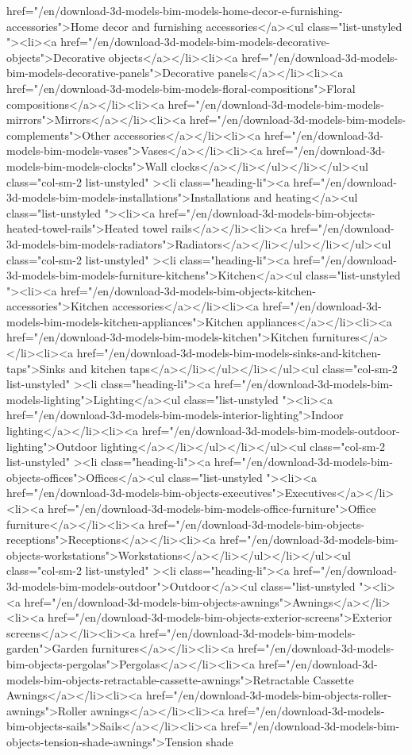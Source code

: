 href="/en/download-3d-models-bim-models-home-decor-e-furnishing-accessories">Home decor and furnishing accessories</a><ul class="list-unstyled "><li><a href="/en/download-3d-models-bim-models-decorative-objects">Decorative objects</a></li><li><a href="/en/download-3d-models-bim-models-decorative-panels">Decorative panels</a></li><li><a href="/en/download-3d-models-bim-models-floral-compositions">Floral compositions</a></li><li><a href="/en/download-3d-models-bim-models-mirrors">Mirrors</a></li><li><a href="/en/download-3d-models-bim-models-complements">Other accessories</a></li><li><a href="/en/download-3d-models-bim-models-vases">Vases</a></li><li><a href="/en/download-3d-models-bim-models-clocks">Wall clocks</a></li></ul></li></ul><ul class="col-sm-2 list-unstyled" ><li class="heading-li"><a href="/en/download-3d-models-bim-models-installations">Installations and heating</a><ul class="list-unstyled "><li><a href="/en/download-3d-models-bim-objects-heated-towel-rails">Heated towel rails</a></li><li><a href="/en/download-3d-models-bim-models-radiators">Radiators</a></li></ul></li></ul><ul class="col-sm-2 list-unstyled" ><li class="heading-li"><a href="/en/download-3d-models-bim-models-furniture-kitchens">Kitchen</a><ul class="list-unstyled "><li><a href="/en/download-3d-models-bim-objects-kitchen-accessories">Kitchen accessories</a></li><li><a href="/en/download-3d-models-bim-models-kitchen-appliances">Kitchen appliances</a></li><li><a href="/en/download-3d-models-bim-models-kitchen">Kitchen furnitures</a></li><li><a href="/en/download-3d-models-bim-models-sinks-and-kitchen-taps">Sinks and kitchen taps</a></li></ul></li></ul><ul class="col-sm-2 list-unstyled" ><li class="heading-li"><a href="/en/download-3d-models-bim-models-lighting">Lighting</a><ul class="list-unstyled "><li><a href="/en/download-3d-models-bim-models-interior-lighting">Indoor lighting</a></li><li><a href="/en/download-3d-models-bim-models-outdoor-lighting">Outdoor lighting</a></li></ul></li></ul><ul class="col-sm-2 list-unstyled" ><li class="heading-li"><a href="/en/download-3d-models-bim-objects-offices">Offices</a><ul class="list-unstyled "><li><a href="/en/download-3d-models-bim-objects-executives">Executives</a></li><li><a href="/en/download-3d-models-bim-models-office-furniture">Office furniture</a></li><li><a href="/en/download-3d-models-bim-objects-receptions">Receptions</a></li><li><a href="/en/download-3d-models-bim-objects-workstations">Workstations</a></li></ul></li></ul><ul class="col-sm-2 list-unstyled" ><li class="heading-li"><a href="/en/download-3d-models-bim-models-outdoor">Outdoor</a><ul class="list-unstyled "><li><a href="/en/download-3d-models-bim-objects-awnings">Awnings</a></li><li><a href="/en/download-3d-models-bim-objects-exterior-screens">Exterior screens</a></li><li><a href="/en/download-3d-models-bim-models-garden">Garden furnitures</a></li><li><a href="/en/download-3d-models-bim-objects-pergolas">Pergolas</a></li><li><a href="/en/download-3d-models-bim-objects-retractable-cassette-awnings">Retractable Cassette Awnings</a></li><li><a href="/en/download-3d-models-bim-objects-roller-awnings">Roller awnings</a></li><li><a href="/en/download-3d-models-bim-objects-sails">Sails</a></li><li><a href="/en/download-3d-models-bim-objects-tension-shade-awnings">Tension shade 